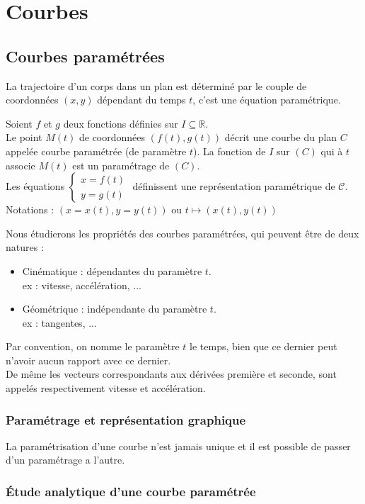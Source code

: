 \part{Courbes}
\chapter{Courbes paramétrées}
La trajectoire d'un corps dans un plan est déterminé par le couple de coordonnées $(x,y)$ dépendant du temps $t$, c'est une équation paramétrique.
\begin{defi}
Soient $f$ et $g$ deux fonctions définies sur $I\subseteq
\mathbb{R}$.\\
Le point $M(t)$ de coordonnées $(f(t),g(t))$ décrit une courbe du plan $C$ appelée courbe paramétrée (de paramètre $t$).
La fonction de $I$ sur $(C)$ qui à $t$ associe $M(t)$ est un paramétrage de $(C)$.\\
Les équations $\begin{cases}x=f(t)\\y=g(t)\end{cases}$ définissent une représentation paramétrique de $\mathscr{C}$.\\
Notations : $(x=x(t),y=y(t))$ ou $t\mapsto(x(t),y(t))$
\end{defi}
Nous étudierons les propriétés des courbes paramétrées, qui peuvent être de deux natures :
\begin{itemize}
    \item Cinématique : dépendantes du paramètre $t$.\\
    ex : vitesse, accélération, ...
    \item Géométrique : indépendante du paramètre $t$.\\
    ex : tangentes, ...
\end{itemize}
\begin{rmq}
Par convention, on nomme le paramètre $t$ le temps, bien que ce dernier peut n'avoir aucun rapport avec ce dernier.\\
De même les vecteurs correspondants aux dérivées première et seconde, sont appelés respectivement vitesse et accélération.
\end{rmq}
\section{Paramétrage et représentation graphique}
La paramétrisation d'une courbe n'est jamais unique et il est possible de passer d'un paramétrage a l'autre.
\section{Étude analytique d'une courbe paramétrée}
